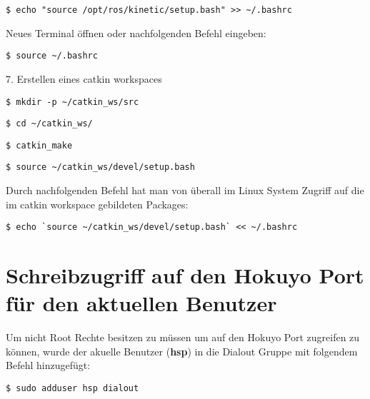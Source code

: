 \begin{lstlisting}
$ echo "source /opt/ros/kinetic/setup.bash" >> ~/.bashrc
\end{lstlisting}
\vspace{-0.8cm}

Neues Terminal öffnen oder nachfolgenden Befehl eingeben:\\

\begin{lstlisting}
$ source ~/.bashrc
\end{lstlisting}
\vspace{-0.8cm}

7. Erstellen eines catkin workspaces \\

\begin{lstlisting}
$ mkdir -p ~/catkin_ws/src
\end{lstlisting}

\begin{lstlisting}
$ cd ~/catkin_ws/
\end{lstlisting}

\begin{lstlisting}
$ catkin_make
\end{lstlisting}

\begin{lstlisting}
$ source ~/catkin_ws/devel/setup.bash
\end{lstlisting}
\vspace{-0.8cm}

Durch nachfolgenden Befehl hat man von überall im Linux System Zugriff auf die im catkin workspace gebildeten Packages:\\ 

\begin{lstlisting}
$ echo `source ~/catkin_ws/devel/setup.bash` << ~/.bashrc
\end{lstlisting}







\section{Schreibzugriff auf den Hokuyo Port für den aktuellen Benutzer}
Um nicht Root Rechte besitzen zu müssen um auf den Hokuyo Port zugreifen zu können, wurde der akuelle Benutzer (\textbf{hsp}) in die Dialout Gruppe mit folgendem Befehl hinzugefügt:\\

\begin{lstlisting}
$ sudo adduser hsp dialout
\end{lstlisting}

